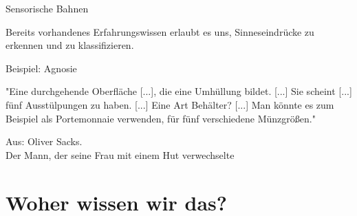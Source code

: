 \documentclass{beamer}
\begin{document}
\begin{frame}{Sensorische Bahnen}

Bereits vorhandenes Erfahrungswissen erlaubt es uns, Sinneseindrücke zu erkennen und zu klassifizieren. \\[1cm]


\begin{block}{Beispiel: Agnosie}

"Eine durchgehende Oberfläche [...], die eine Umhüllung bildet. [...] Sie scheint [...] fünf Ausstülpungen zu haben. [...] Eine Art Behälter? [...] Man könnte es zum Beispiel als Portemonnaie verwenden, für fünf verschiedene Münzgrößen." 

\begin{flushright}
Aus: Oliver Sacks.  \\ Der Mann, der seine Frau mit einem Hut verwechselte 
\end{flushright}
 

\end{block}




\end{frame}



\section{Woher wissen wir das?}
\end{document}
